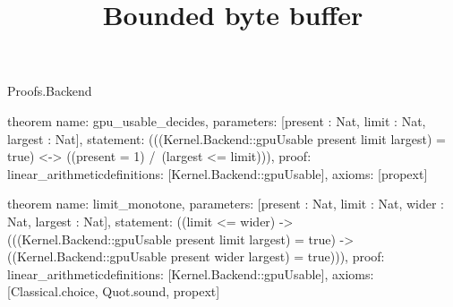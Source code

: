 \begin{lexlean}{Proofs.Backend}
\title{Bounded byte buffer}
\begin{semanticmodule}
theorem{
  name: gpu_usable_decides,
  parameters: [present : Nat, limit : Nat, largest : Nat],
  statement: (((Kernel.Backend::gpuUsable present limit largest) = true) <-> ((present = 1) /\ (largest <= limit))),
  proof: linear_arithmetic{definitions: [Kernel.Backend::gpuUsable]},
  axioms: [propext]
}

theorem{
  name: limit_monotone,
  parameters: [present : Nat, limit : Nat, wider : Nat, largest : Nat],
  statement: ((limit <= wider) -> (((Kernel.Backend::gpuUsable present limit largest) = true) -> ((Kernel.Backend::gpuUsable present wider largest) = true))),
  proof: linear_arithmetic{definitions: [Kernel.Backend::gpuUsable]},
  axioms: [Classical.choice, Quot.sound, propext]
}
\end{semanticmodule}
\end{lexlean}
